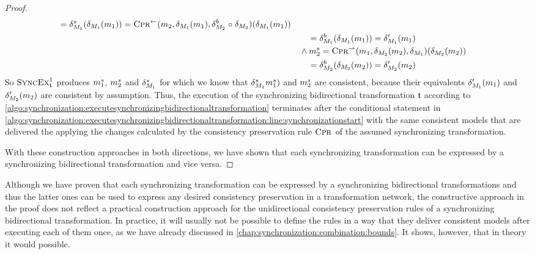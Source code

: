 \begin{proof}
\begin{align*}
        = \change{\metamodel{M}{1}}^{s}(\change{\metamodel{M}{1}}(\model{m}{1})) %
        = \consistencypreservationrule{}^{\leftarrow}(\model{m}{2},\change{\metamodel{M}{1}}(\model{m}{1}),\change{\metamodel{M}{2}}^{b} \concatfunction \change{\metamodel{M}{2}})(\change{\metamodel{M}{1}}(\model{m}{1})) %
        \\
        & \formulaskip\formulaskip
        = \change{\metamodel{M}{1}}^{b}(\change{\metamodel{M}{1}}(\model{m}{1}))
        = \change{\metamodel{M}{1}}'(\model{m}{1}) \\
        & \formulaskip
        \land
        \model{m}{2}^{s}
        = \consistencypreservationrule{}^{\rightarrow}(\model{m}{1},\change{\metamodel{M}{2}}(\model{m}{2}),\change{\metamodel{M}{1}})(\change{\metamodel{M}{2}}(\model{m}{2})) %
        \\
        & \formulaskip\formulaskip
        = \change{\metamodel{M}{2}}^{b}(\change{\metamodel{M}{2}}(\model{m}{2})) %
        = \change{\metamodel{M}{2}}'(\model{m}{2})
    \end{align*}
    So $\textsc{SyncEx}_{\mathfrak{t}}^1$ produces $m_{1}^{s}$, $m_{2}^{s}$ and $\delta_{M_{1}}^{s}$ for which we know that $\delta_{M_{1}}^{s}m_{1}^{s})$ and $m_{2}^{s}$ are consistent, because their equivalents $\delta_{M_{1}}'(m_{1})$ and $\delta_{M_{2}}'(m_{2})$ are consistent by assumption.
    Thus, the execution of the synchronizing bidirectional transformation $\mathfrak{t}$ according to \autoref{algo:synchronization:executesynchronizingbidirectionaltransformation} terminates after the conditional statement in \autoref{algo:synchronization:executesynchronizingbidirectionaltransformation:line:synchronizationstart} with the same consistent models that are delivered the applying the changes calculated by the consistency preservation rule $\textsc{Cpr}_{}$ of the assumed synchronizing transformation.

    With these construction approaches in both directions, we have shown that each synchronizing transformation can be expressed by a synchronizing bidirectional transformation and vice versa.
\end{proof}

Although we have proven that each synchronizing transformation can be expressed by a synchronizing bidirectional transformations and thus the latter ones can be used to express any desired consistency preservation in a transformation network, the constructive approach in the proof does not reflect a practical construction approach for the unidirectional consistency preservation rules of a synchronizing bidirectional transformation.
In practice, it will usually not be possible to define the rules in a way that they deliver consistent models after executing each of them once, as we have already discussed in \autoref{chap:synchronization:combination:bounds}.
It shows, however, that in theory it would possible.

